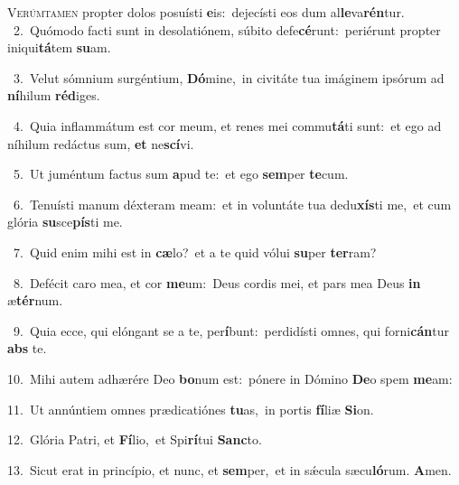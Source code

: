 \lettrine{\initial\textcolor{\initialcolor}{V}}{erúmtamen} propter dolos posuísti \textbf{e}\-is:~\star dejecísti eos dum al\-\textbf{le}\-va\-\textbf{rén}\-tur.\\
{\numbfont\textcolor{\numbcolor}{~2.}}~Quómodo facti sunt in desolatiónem, súbito defe\-\textbf{cé}\-runt:~\star periérunt propter iniqui\-\textbf{tá}\-tem \textbf{su}\-am.\par
{\numbfont\textcolor{\numbcolor}{~3.}}~Velut sómnium surgéntium, \textbf{Dó}\-mine,~\star in civitáte tua imáginem ipsórum ad \textbf{ní}\-hilum \textbf{réd}\-iges.\par
{\numbfont\textcolor{\numbcolor}{~4.}}~Quia inflammátum est cor meum, et renes mei commu\-\textbf{tá}\-ti sunt:~\star et ego ad níhilum redáctus sum, \textbf{et} ne\-\textbf{scí}\-vi.\par
{\numbfont\textcolor{\numbcolor}{~5.}}~Ut juméntum factus sum \textbf{a}\-pud te:~\star et ego \textbf{sem}\-per \textbf{te}\-cum.\par
{\numbfont\textcolor{\numbcolor}{~6.}}~Tenuísti manum déxteram meam:~\dagger et in voluntáte tua dedu\-\textbf{xís}\-ti me,~\star et cum glória \textbf{su}\-sce\-\textbf{pís}\-ti me.\par
{\numbfont\textcolor{\numbcolor}{~7.}}~Quid enim mihi est in \textbf{cæ}\-lo?~\star et a te quid vólui \textbf{su}\-per \textbf{ter}\-ram?\par
{\numbfont\textcolor{\numbcolor}{~8.}}~Defécit caro mea, et cor \textbf{me}\-um:~\star Deus cordis mei, et pars mea Deus \textbf{in} æ\-\textbf{tér}\-num.\par
{\numbfont\textcolor{\numbcolor}{~9.}}~Quia ecce, qui elóngant se a te, per\-\textbf{í}\-bunt:~\star perdidísti omnes, qui forni\-\textbf{cán}\-tur \textbf{abs} te.\par
{\numbfont\textcolor{\numbcolor}{10.}}~Mihi autem adhærére Deo \textbf{bo}\-num est:~\star pónere in Dómino \textbf{De}\-o spem \textbf{me}\-am:\par
{\numbfont\textcolor{\numbcolor}{11.}}~Ut annúntiem omnes prædicatiónes \textbf{tu}\-as,~\star in portis \textbf{fí}\-liæ \textbf{Si}\-on.\par
{\numbfont\textcolor{\numbcolor}{12.}}~Glória Patri, et \textbf{Fí}\-lio,~\star et Spi\-\textbf{rí}\-tui \textbf{Sanc}\-to.\par
{\numbfont\textcolor{\numbcolor}{13.}}~Sicut erat in princípio, et nunc, et \textbf{sem}\-per,~\star et in sǽcula sæcu\-\textbf{ló}\-rum. \textbf{A}\-men.\par
